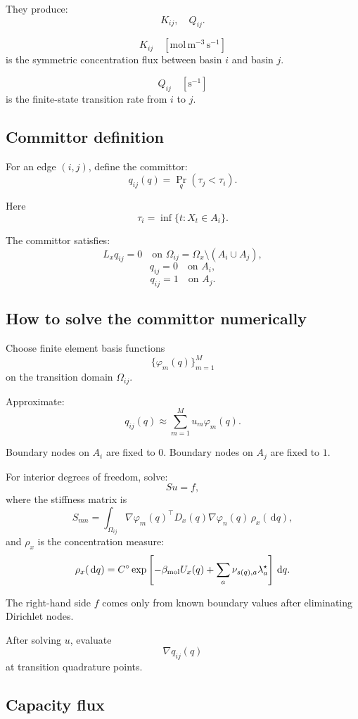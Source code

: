 \documentclass[11pt]{article}
\newcommand{\dd}{\,\mathrm d}
\begin{document}
  They produce:
  \[
  K_{ij},\quad Q_{ij}.
  \]

  \[
  K_{ij}
  \quad [\mathrm{mol\,m^{-3}\,s^{-1}}]
  \]
  is the symmetric concentration flux between basin \(i\) and basin \(j\).

  \[
  Q_{ij}
  \quad [\mathrm{s^{-1}}]
  \]
  is the finite-state transition rate from \(i\) to \(j\).

  \subsection{Committor definition}

  For an edge \((i,j)\), define the committor:
  \[
  q_{ij}(q)
  =
  \Pr_q(\tau_j<\tau_i).
  \]

  Here
  \[
  \tau_i=\inf\{t:X_t\in A_i\}.
  \]

  The committor satisfies:
  \[
  L_x q_{ij}=0
  \quad
  \text{on }\Omega_{ij}=\Omega_x\setminus(A_i\cup A_j),
  \]
  \[
  q_{ij}=0
  \quad
  \text{on }A_i,
  \]
  \[
  q_{ij}=1
  \quad
  \text{on }A_j.
  \]

  \subsection{How to solve the committor numerically}

  Choose finite element basis functions
  \[
  \{\varphi_m(q)\}_{m=1}^{M}
  \]
  on the transition domain \(\Omega_{ij}\).

  Approximate:
  \[
  q_{ij}(q)\approx \sum_{m=1}^{M}u_m\varphi_m(q).
  \]

  Boundary nodes on \(A_i\) are fixed to \(0\).
  Boundary nodes on \(A_j\) are fixed to \(1\).

  For interior degrees of freedom, solve:
  \[
  S u = f,
  \]
  where the stiffness matrix is
  \[
  S_{mn}
  =
  \int_{\Omega_{ij}}
  \nabla\varphi_m(q)^\top
  D_x(q)
  \nabla\varphi_n(q)
  \,\rho_x(\dd q),
  \]
  and \(\rho_x\) is the concentration measure:
  \[
  \rho_x(\dd q)
  =
  C^\circ
  \exp
  \left[
  -\beta_{\rm mol}U_x(q)
  +
  \sum_a\nu_{s(q),a}\lambda_a^\star
  \right]\dd q.
  \]

  The right-hand side \(f\) comes only from known boundary values after
  eliminating Dirichlet nodes.

  After solving \(u\), evaluate
  \[
  \nabla q_{ij}(q)
  \]
  at transition quadrature points.

  \subsection{Capacity flux}
\end{document}
